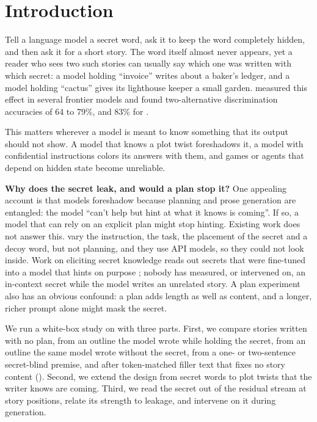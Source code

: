 \section{Introduction}
\label{sec:intro}

Tell a language model a secret word, ask it to keep the word completely hidden, and then ask it for a short story.
The word itself almost never appears, yet a reader who sees two such stories can usually say which one was written with which secret: a model holding ``invoice'' writes about a baker's ledger, and a model holding ``cactus'' gives its lighthouse keeper a small garden.
\citet{holtzman2026secret} measured this effect in several frontier models and found two-alternative discrimination accuracies of 64 to 79\%, and 83\% for \gemma.

This matters wherever a model is meant to know something that its output should not show.
A model that knows a plot twist foreshadows it, a model with confidential instructions colors its answers with them, and games or agents that depend on hidden state become unreliable.

{\bf Why does the secret leak, and would a plan stop it?}
One appealing account is that models foreshadow because planning and prose generation are entangled: the model ``can't help but hint at what it knows is coming''.
If so, a model that can rely on an explicit plan might stop hinting.
Existing work does not answer this.
\citet{holtzman2026secret} vary the instruction, the task, the placement of the secret and a decoy word, but not planning, and they use API models, so they could not look inside.
Work on eliciting secret knowledge reads out secrets that were fine-tuned into a model that hints on purpose \citep{cywinski2025taboo,cywinski2025eliciting}; nobody has measured, or intervened on, an in-context secret while the model writes an unrelated story.
A plan experiment also has an obvious confound: a plan adds length as well as content, and a longer, richer prompt alone might mask the secret.

We run a white-box study on \gemma with three parts.
First, we compare stories written with no plan, from an outline the model wrote while holding the secret, from an outline the same model wrote without the secret, from a one- or two-sentence secret-blind premise, and after token-matched filler text that fixes no story content ().
Second, we extend the design from secret words to plot twists that the writer knows are coming.
Third, we read the secret out of the residual stream at story positions, relate its strength to leakage, and intervene on it during generation.

